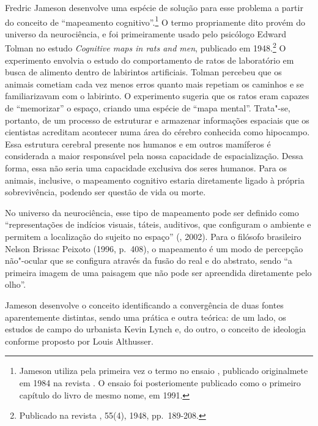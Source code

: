 Fredric Jameson desenvolve uma espécie de solução para esse problema a
partir do conceito de ``mapeamento cognitivo''.\footnote{Jameson utiliza
  pela primeira vez o termo no ensaio {}, publicado originalmete em 1984 na
  revista {}. O ensaio foi posteriomente publicado como o
  primeiro capítulo do livro de mesmo nome, em 1991.} O termo
propriamente dito provém do universo da neurociência, e foi
primeiramente usado pelo psicólogo Edward Tolman no estudo \label{tolman}
\emph{Cognitive maps in rats and men}, publicado em 1948.\footnote{Publicado na
  revista {}, 55(4), 1948, pp.~189-208.} O
experimento envolvia o estudo do comportamento de ratos de laboratório
em busca de alimento dentro de labirintos artificiais. Tolman percebeu
que os animais cometiam cada vez menos erros quanto mais repetiam os
caminhos e se familiarizavam com o labirinto. O experimento sugeria que
os ratos eram capazes de ``memorizar'' o espaço, criando uma espécie de
``mapa mental''. Trata"-se, portanto, de um processo de estruturar e
armazenar informações espaciais que os cientistas acreditam acontecer
numa área do cérebro conhecida como hipocampo. Essa estrutura cerebral
presente nos humanos e em outros mamíferos é considerada a maior
responsável pela nossa capacidade de espacialização. Dessa forma, essa
não seria uma capacidade exclusiva dos seres humanos. Para os animais,
inclusive, o mapeamento cognitivo estaria diretamente ligado à própria
sobrevivência, podendo ser questão de vida ou morte.

No universo da neurociência, esse tipo de mapeamento pode ser definido
como ``representações de indícios visuais, táteis, auditivos, que
configuram o ambiente e permitem a localização do sujeito no espaço''
(, 2002). Para o filósofo brasileiro Nelson Brissac Peixoto (1996, p.~408), o mapeamento é um modo de percepção não"-ocular que se configura
através da fusão do real e do abstrato, sendo ``a primeira imagem de uma
paisagem que não pode ser apreendida diretamente pelo olho''.

Jameson desenvolve o conceito identificando a convergência de duas
fontes aparentemente distintas, sendo uma prática e outra teórica: de um
lado, os estudos de campo do urbanista Kevin Lynch e, do outro, o
conceito de ideologia conforme proposto por Louis Althusser.


